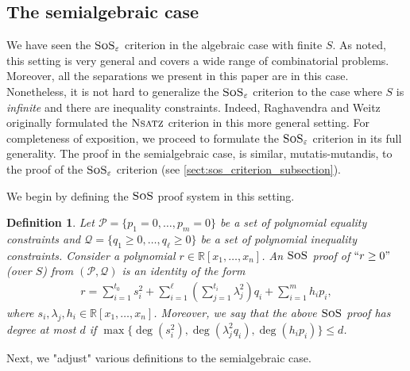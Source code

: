 \documentclass[11pt]{article}
\newcommand{\sos}{\text{\sc{SoS}}}
\newcommand{\Nsatz}{\textsc{Nsatz}}
\newcommand{\1}{\textbf{1}}
\newtheorem{definition}[theorem]{Definition}
\begin{document}
\subsection{The semialgebraic case}\label{sect:semialgebraic_sos_criterion}

We have seen the $\sos_{\varepsilon}$ criterion in the algebraic case with finite $S$. As noted, this setting is very general and covers a wide range of combinatorial problems. Moreover, all the separations we present in this paper are in this case.
Nonetheless, it is not hard to generalize the $\sos_{\varepsilon}$ criterion to the case where $S$ is \textit{infinite} and there are inequality constraints.
Indeed, Raghavendra and Weitz \cite{raghavendra_weitz2017} originally formulated the $\Nsatz$ criterion in this more general setting. For completeness of exposition, we proceed to formulate the $\sos_{\varepsilon}$ criterion in its full generality. The proof in the semialgebraic case, is similar, mutatis-mutandis, to the proof of the $\sos_{\varepsilon}$ criterion (see \cref{sect:sos_criterion_subsection}).

We begin by defining the $\sos$ proof system in this setting.

\begin{definition}
    Let $\mathcal{P} = \{p_1=0,\ldots,p_m=0\}$ be a set of polynomial equality constraints and $\mathcal{Q} = \{q_1 \geq 0, \ldots, q_\ell \geq 0\}$ be a set of polynomial inequality constraints. Consider a polynomial $r\in \mathbb{R}[x_1, \dots, x_n]$. An $\sos$ proof of $``r\geq 0"$ (over $S$) from $(\mathcal{P}, \mathcal{Q})$ is an identity of the form 
    \begin{align*}
        r = \sum_{i=1}^{t_0} s_i^2 + \sum_{i=1}^\ell \left( \sum_{j=1}^{t_i} \lambda_j^2 \right) q_i + \sum_{i=1}^m h_i p_i,
    \end{align*}
    where $s_i, \lambda_j, h_i\in \mathbb{R}[x_1, \ldots, x_n]$. Moreover, we say that the above $\sos$ proof 
    has \emph{degree} at most $d$ if $\max \{\deg(s_i^2), \deg(\lambda_j^2 q_i), \deg(h_ip_i)\} \leq d$.
\end{definition}

Next, we "adjust" various definitions to the semialgebraic case.
\end{document}

